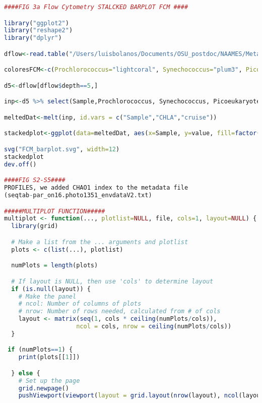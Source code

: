 \documentclass{article}
\begin{document}
\begin{lstlisting}[language=R,caption={N1N2figscripts}]
####FIG 3a Flow Cytometry STALCKED BARPLOT FCM ####

library("ggplot2")
library("reshape2")
library("dplyr")

dflow<-read.table("/Users/luisbolanos/Documents/OSU_postdoc/NAAMES/Metadata/Jason_Data/Rorganized/flowcytmetadata.txt",header=T, sep ="\t")

coloresFCM<-c(Prochlorococcus="lightcoral", Synechococcus="plum3", Picoeukaryotes="forestgreen", Nanoeukaryotes="blue")

d5<-dflow[dflow$depth==5,]

inp<-d5 %>% select(Sample,Prochlorococcus, Synechococcus, Picoeukaryotes, Nanoeukaryotes, CHLA,cruise)

meltedDat<-melt(inp, id.vars = c("Sample","CHLA","cruise")) 

stackedplot<-ggplot(data=meltedDat, aes(x=Sample, y=value, fill=factor(variable))) + geom_bar(stat="identity")+ scale_fill_manual(values =coloresFCM) +geom_line(aes(x=Sample, y=CHLA*10000000), stat="identity",color="red",group = 1, size=1.5)+scale_y_continuous(sec.axis = sec_axis(~./10000000,name = "Chlorophyll a [mg/m^3]"))+theme_bw()+facet_grid( . ~ cruise,scales = "free") + ylab("Cell counts [cells/mL]")+theme(axis.text.x = element_text(angle=30, size=6),axis.text.y= element_text(size=12),legend.text=element_text(size=13) )

svg("FCM_barplot.svg", width=12)
stackedplot
dev.off()

####FIG S2-S5####
PROFILES, we added CHAO1 index to the metadata file
(seqtab-par_on16.photo1351_envdataV2.txt)

#####MULTIPLOT FUNCTION#####
multiplot <- function(..., plotlist=NULL, file, cols=1, layout=NULL) {
  library(grid)

  # Make a list from the ... arguments and plotlist
  plots <- c(list(...), plotlist)

  numPlots = length(plots)

  # If layout is NULL, then use 'cols' to determine layout
  if (is.null(layout)) {
    # Make the panel
    # ncol: Number of columns of plots
    # nrow: Number of rows needed, calculated from # of cols
    layout <- matrix(seq(1, cols * ceiling(numPlots/cols)),
                    ncol = cols, nrow = ceiling(numPlots/cols))
  }

 if (numPlots==1) {
    print(plots[[1]])

  } else {
    # Set up the page
    grid.newpage()
    pushViewport(viewport(layout = grid.layout(nrow(layout), ncol(layout))))


\end{lstlisting}
\end{document}

